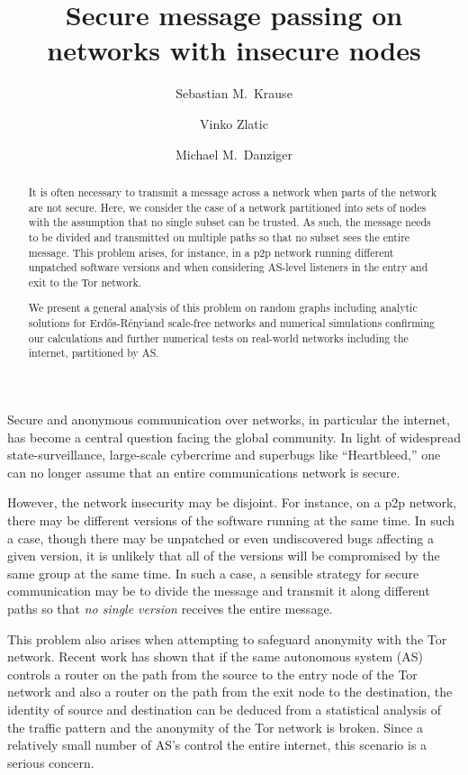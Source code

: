 \documentclass[aps, prl, twocolumn, a4paper, floatfix]{revtex4}
\newcommand{\er}{Erd\H{o}s-R\'{e}nyi}
\begin{document}
\title{Secure message passing on networks with insecure nodes}
\author{Sebastian M.\ Krause}
\author{Vinko Zlatic}
\author{Michael M.\ Danziger}


\begin{abstract}
It is often necessary to transmit a message across a network when parts of the network are not secure.
Here, we consider the case of a network partitioned into sets of nodes with the assumption that no single subset can be trusted.
As such, the message needs to be divided and transmitted on multiple paths so that no subset sees the entire message.
This problem arises, for instance, in a p2p network running different unpatched software versions 
and when considering AS-level listeners in the entry and exit to the Tor network.

We present a general analysis of this problem on random graphs including analytic solutions for \er and scale-free networks and numerical simulations confirming our calculations and further numerical tests on real-world networks including the internet, partitioned by AS.
\end{abstract}
\maketitle

Secure and anonymous communication over networks, in particular the internet, has become a central question facing the global community.
In light of widespread state-surveillance, large-scale cybercrime and superbugs like ``Heartbleed,'' one can no longer assume that an entire communications network is secure.

However, the network insecurity may be disjoint.  
For instance, on a p2p network, there may be different versions of the software running at the same time.  
In such a case, though there may be unpatched or even undiscovered bugs affecting a given version, it is unlikely that all of the versions will be compromised by the same group at the same time.
In such a case, a sensible strategy for secure communication may be to divide the message and transmit it along different paths so that \textit{no single version} receives the entire message.

This problem also arises when attempting to safeguard anonymity with the Tor network.  
Recent work has shown that if the same autonomous system (AS) controls a router on the path from the source to the entry node of the Tor network and also a router on the path from the exit node to the destination, the identity of source and destination can be deduced from a statistical analysis of the traffic pattern and the anonymity of the Tor network is broken.
Since a relatively small number of AS's control the entire internet, this scenario is a serious concern.
\end{document}
